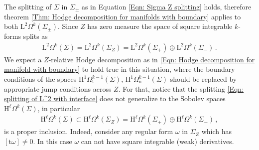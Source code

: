 The splitting of $\Sigma$ in $\Sigma_\pm$ as in Equation \eqref{Eqn: Sigma Z splitting} holds, therefore theorem \ref{Thm: Hodge decomposition for manifolds with boundary} applies to both $\mathrm{L}^2\Omega^k(\Sigma_\pm)$.
Since $Z$ has zero measure the space of square integrable $k$-forms splits as
\begin{align}\label{Eqn: splitting of L^2 with interface}
	\mathrm{L}^2\Omega^k(\Sigma)=
	\mathrm{L}^2\Omega^k(\Sigma_Z)=
	\mathrm{L}^2\Omega^k(\Sigma_+)\oplus\mathrm{L}^2\Omega^k(\Sigma_-)\,.
\end{align}
We expect a $Z$-relative Hodge decomposition as in \eqref{Eqn: Hodge decomposition for manifold with boundary} to hold true in this situation, where the boundary conditions of the spaces $\mathrm{H}^1\Omega^{k-1}_{\mathrm{t}}(\Sigma)$, $\mathrm{H}^1\Omega^{k-1}_{\mathrm{n}}(\Sigma)$ should be replaced by appropriate jump conditions across $Z$.
For that, notice that the splitting \eqref{Eqn: splitting of L^2 with interface} does not generalize to the Sobolev spaces $\mathrm{H}^\ell\Omega^k(\Sigma)$, in particular
\begin{align}
	\mathrm{H}^\ell\Omega^k(\Sigma)\subset
	\mathrm{H}^\ell\Omega^k(\Sigma_Z)=
	\mathrm{H}^\ell\Omega^k(\Sigma_+)\oplus\mathrm{H}^\ell\Omega^k(\Sigma_-)\,,
\end{align}
is a proper inclusion. Indeed, consider any regular form $\omega$ in $\Sigma_Z$ which has $[\mathrm{t}\omega]\neq 0$. In this case $\omega$ can not have square integrable (weak) derivatives.


